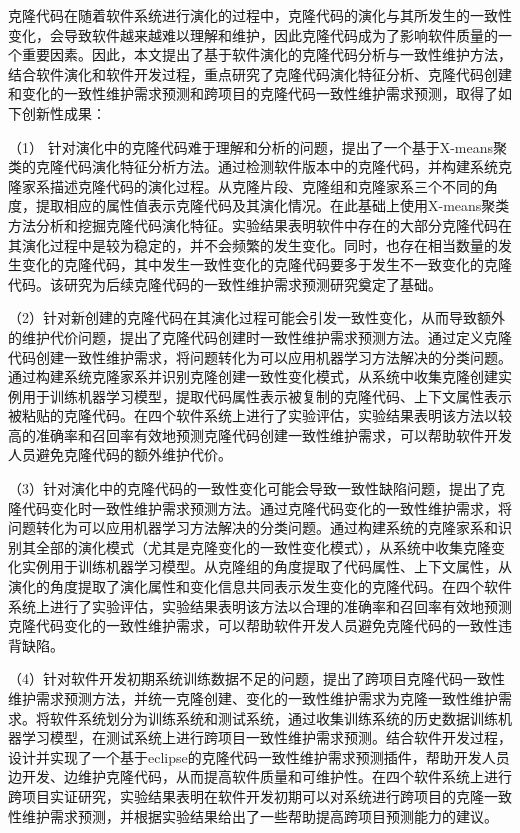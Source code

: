 

克隆代码在随着软件系统进行演化的过程中，克隆代码的演化与其所发生的一致性变化，会导致软件越来越难以理解和维护，因此克隆代码成为了影响软件质量的一个重要因素。因此，本文提出了基于软件演化的克隆代码分析与一致性维护方法，结合软件演化和软件开发过程，重点研究了克隆代码演化特征分析、克隆代码创建和变化的一致性维护需求预测和跨项目的克隆代码一致性维护需求预测，取得了如下创新性成果：

（1） 针对演化中的克隆代码难于理解和分析的问题，提出了一个基于X-means聚类的克隆代码演化特征分析方法。通过检测软件版本中的克隆代码，并构建系统克隆家系描述克隆代码的演化过程。从克隆片段、克隆组和克隆家系三个不同的角度，提取相应的属性值表示克隆代码及其演化情况。在此基础上使用X-means聚类方法分析和挖掘克隆代码演化特征。实验结果表明软件中存在的大部分克隆代码在其演化过程中是较为稳定的，并不会频繁的发生变化。同时，也存在相当数量的发生变化的克隆代码，其中发生一致性变化的克隆代码要多于发生不一致变化的克隆代码。该研究为后续克隆代码的一致性维护需求预测研究奠定了基础。

（2）针对新创建的克隆代码在其演化过程可能会引发一致性变化，从而导致额外的维护代价问题，提出了克隆代码创建时一致性维护需求预测方法。通过定义克隆代码创建一致性维护需求，将问题转化为可以应用机器学习方法解决的分类问题。通过构建系统克隆家系并识别克隆创建一致性变化模式，从系统中收集克隆创建实例用于训练机器学习模型，提取代码属性表示被复制的克隆代码、上下文属性表示被粘贴的克隆代码。在四个软件系统上进行了实验评估，实验结果表明该方法以较高的准确率和召回率有效地预测克隆代码创建一致性维护需求，可以帮助软件开发人员避免克隆代码的额外维护代价。

（3）针对演化中的克隆代码的一致性变化可能会导致一致性缺陷问题，提出了克隆代码变化时一致性维护需求预测方法。通过克隆代码变化的一致性维护需求，将问题转化为可以应用机器学习方法解决的分类问题。通过构建系统的克隆家系和识别其全部的演化模式（尤其是克隆变化的一致性变化模式），从系统中收集克隆变化实例用于训练机器学习模型。从克隆组的角度提取了代码属性、上下文属性，从演化的角度提取了演化属性和变化信息共同表示发生变化的克隆代码。在四个软件系统上进行了实验评估，实验结果表明该方法以合理的准确率和召回率有效地预测克隆代码变化的一致性维护需求，可以帮助软件开发人员避免克隆代码的一致性违背缺陷。

（4）针对软件开发初期系统训练数据不足的问题，提出了跨项目克隆代码一致性维护需求预测方法，并统一克隆创建、变化的一致性维护需求为克隆一致性维护需求。将软件系统划分为训练系统和测试系统，通过收集训练系统的历史数据训练机器学习模型，在测试系统上进行跨项目一致性维护需求预测。结合软件开发过程，设计并实现了一个基于eclipse的克隆代码一致性维护需求预测插件，帮助开发人员边开发、边维护克隆代码，从而提高软件质量和可维护性。在四个软件系统上进行跨项目实证研究，实验结果表明在软件开发初期可以对系统进行跨项目的克隆一致性维护需求预测，并根据实验结果给出了一些帮助提高跨项目预测能力的建议。

